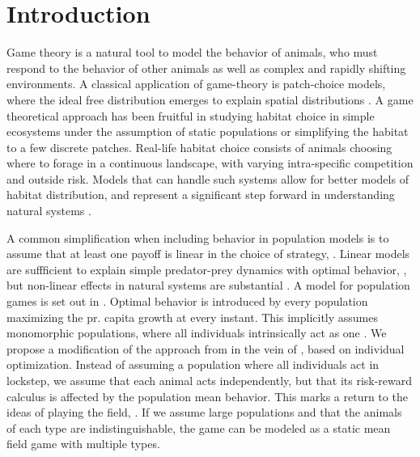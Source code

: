 \section{Introduction}

Game theory is a natural tool to model the behavior of animals, who must respond to the behavior of other animals as well as complex and rapidly shifting environments. A classical application of game-theory is patch-choice models, where the ideal free distribution emerges to explain spatial distributions  \citep{cressman2004ideal, fretwell1969territorial}. A game theoretical approach has been fruitful in studying habitat choice in simple ecosystems under the assumption of static populations or simplifying the habitat to a few discrete patches. Real-life habitat choice consists of animals choosing where to forage in a continuous landscape, with varying intra-specific competition and outside risk. Models that can handle such systems allow for better models of habitat distribution, and represent a significant step forward in understanding natural systems \citep{morris2003shadows}.

A common simplification when including behavior in population models is to assume that at least one payoff is linear in the choice of strategy, \citep{krivan1997dynamic}. Linear models are suffficient to explain simple predator-prey dynamics with optimal behavior, \citep{kvrivan2007lotka}, but non-linear effects in natural systems are substantial \citep{gross2009generalized}. A model for population games is set out in \citep{vincent2005evolutionary}.  Optimal behavior is introduced by every population maximizing the pr. capita growth at every instant. This implicitly assumes monomorphic populations, where all individuals intrinsically act as one \citep{malone2020ecology,stump2017optimally}. We propose a modification of the approach from \citep{vincent2005evolutionary} in the vein of \citep{cressman2010ideal}, based on individual optimization. Instead of assuming a population where all individuals act in lockstep, we assume that each animal acts independently, but that its risk-reward calculus is affected by the population mean behavior. This marks a return to the ideas of playing the field, \citep{smith1982evolution, cressman2010ideal}. If we assume large populations and that the animals of each type are indistinguishable, the game can be modeled as a static mean field game with multiple types.


